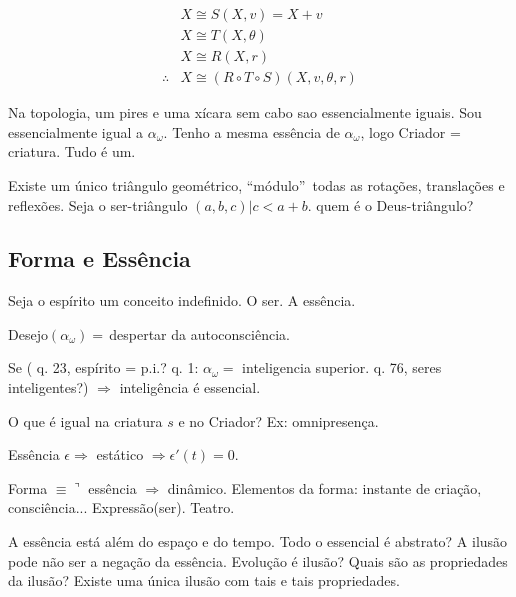 \documentclass[12pt,a4paper]{article}
\begin{document}

			\begin{align*}
				&X \cong S(X,v) = X + v \\
				&X \cong T(X, \theta) \\
				&X \cong R(X, r) \\
				\therefore &X \cong (R \circ T \circ S) (X, v, \theta, r)
			\end{align*}

			Na topologia, um pires e uma x\'icara sem cabo sao essencialmente iguais. Sou essencialmente igual a $\alpha_\omega$. Tenho a mesma ess\^encia de $\alpha_\omega$, logo Criador = criatura. Tudo \'e um.

			Existe um \'unico tri\^angulo geom\'etrico, \textquotedblleft m\'odulo\textquotedblright\, todas as rota\c{c}\~oes, transla\c{c}\~oes e reflex\~oes. Seja o ser-tri\^angulo $(a,b,c) | c < a + b$. quem \'e o Deus-tri\^angulo?

		\subsection{Forma e Ess\^encia}\label{essencia}
			\begin{flushright}
			\end{flushright}

			Seja o esp\'irito um conceito indefinido. O ser. A ess\^encia.

			Desejo$(\alpha_\omega) = $\,despertar da autoconsci\^encia.

			Se (\cite{le} q. 23, esp\'irito = p.i.? \cite{le} q. 1: $\alpha_\omega = $ inteligencia superior. \cite{le} q. 76, seres inteligentes?) $\Rightarrow$ intelig\^encia \'e essencial.

			O que \'e igual na criatura $s$ e no Criador? Ex: omnipresen\c{c}a.

			Ess\^encia $\epsilon \Rightarrow$ est\'atico $\Rightarrow \epsilon'(t) = 0$.

			Forma $\equiv \urcorner$ ess\^encia $\Rightarrow$ din\^amico. Elementos da forma: instante de cria\c{c}\~ao, consci\^encia... Express\~ao(ser). Teatro.

			A ess\^encia est\'a al\'em do espa\c{c}o e do tempo. Todo o essencial \'e abstrato? A ilus\~ao pode n\~ao ser a nega\c{c}\~ao da ess\^encia. Evolu\c{c}\~ao \'e ilus\~ao? Quais s\~ao as propriedades da ilus\~ao? Existe uma \'unica ilus\~ao com tais e tais propriedades.
\end{document}
